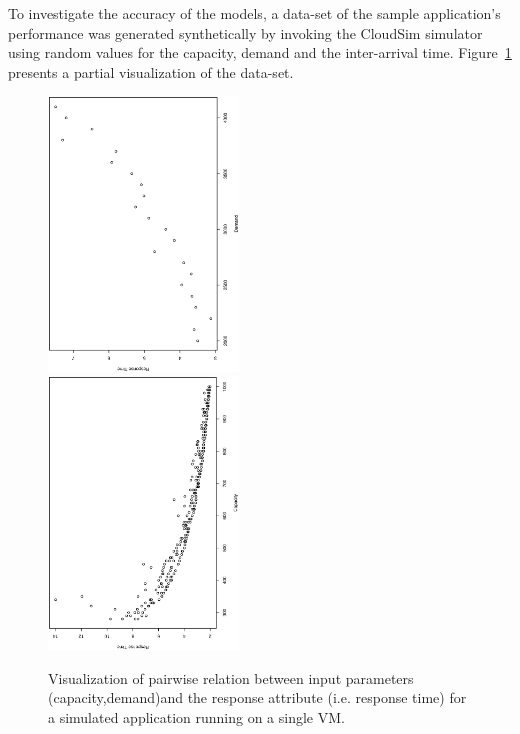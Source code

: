 To investigate the accuracy of the models, a data-set of the sample application's performance was generated synthetically by invoking the CloudSim simulator using random values for the capacity, demand and the inter-arrival time. Figure~\ref{fig:arrival-rate-effect-on-response-time} presents a partial visualization of the data-set. 
\begin{figure}
	\centering
	\includegraphics[width=0.45\textwidth,angle=-90,origin=c]{image/centralized1/demand_response_time} \\
	\includegraphics[width=0.45\textwidth,angle=-90,origin=c]{image/centralized1/response_time_capacity}
	\caption[Visualization of pairwise relation between input parameters (capacity,demand) and the response attribute (i.e. response time) for a simulated application.]{Visualization of pairwise relation between input parameters (capacity,demand)and the response attribute (i.e. response time) for a simulated application running on a single VM.}
	\label{fig:arrival-rate-effect-on-response-time}
\end{figure}

